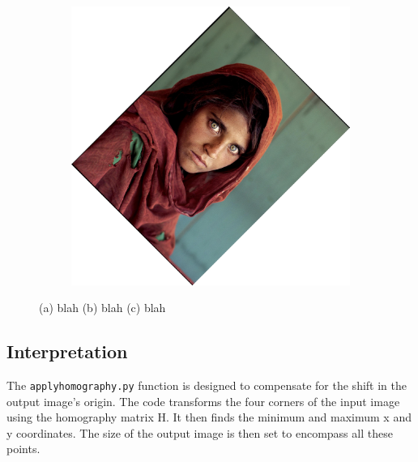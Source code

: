 \documentclass{article}
\begin{document}
\begin{figure}[H]
\begin{subfigure}{.3\textwidth}
        \subcaption{}
    \end{subfigure}
    \begin{subfigure}{.3\textwidth}
        \centering
        \includegraphics[scale=0.04]{q1/output/similar_2_2_2.jpg}
        \subcaption{}
    \end{subfigure}
    \caption{(a) blah (b) blah (c) blah}
\end{figure}

\subsection{Interpretation}
The \texttt{applyhomography.py} function is designed to compensate for the shift in the output image's origin. The code transforms the four corners of the input image using the homography matrix H. 
It then finds the minimum and maximum x and y coordinates. The size of the output image is then set to encompass all these points. 
\end{document}
